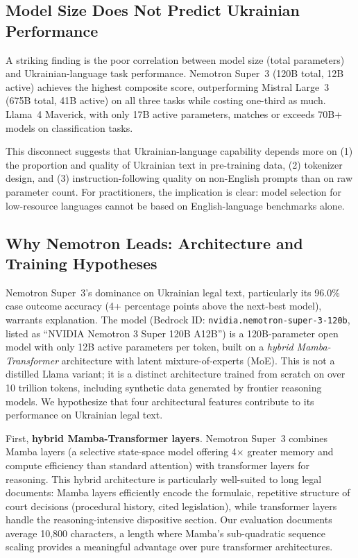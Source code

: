 \documentclass[11pt,a4paper]{article}
\begin{document}
\subsection{Model Size Does Not Predict Ukrainian Performance}

A striking finding is the poor correlation between model size (total parameters) and Ukrainian-language task performance. Nemotron Super~3 (120B total, 12B active) achieves the highest composite score, outperforming Mistral Large~3 (675B total, 41B active) on all three tasks while costing one-third as much. Llama~4 Maverick, with only 17B active parameters, matches or exceeds 70B+ models on classification tasks.

This disconnect suggests that Ukrainian-language capability depends more on (1) the proportion and quality of Ukrainian text in pre-training data, (2) tokenizer design, and (3) instruction-following quality on non-English prompts than on raw parameter count. For practitioners, the implication is clear: model selection for low-resource languages cannot be based on English-language benchmarks alone.

\subsection{Why Nemotron Leads: Architecture and Training Hypotheses}

Nemotron Super~3's dominance on Ukrainian legal text, particularly its 96.0\% case outcome accuracy (4+ percentage points above the next-best model), warrants explanation. The model (Bedrock ID: \texttt{nvidia.nemotron-super-3-120b}, listed as ``NVIDIA Nemotron 3 Super 120B A12B'') is a 120B-parameter open model with only 12B active parameters per token, built on a \emph{hybrid Mamba-Transformer} architecture with latent mixture-of-experts (MoE). This is not a distilled Llama variant; it is a distinct architecture trained from scratch on over 10 trillion tokens, including synthetic data generated by frontier reasoning models. We hypothesize that four architectural features contribute to its performance on Ukrainian legal text.

First, \textbf{hybrid Mamba-Transformer layers}. Nemotron Super~3 combines Mamba layers (a selective state-space model offering 4$\times$ greater memory and compute efficiency than standard attention) with transformer layers for reasoning. This hybrid architecture is particularly well-suited to long legal documents: Mamba layers efficiently encode the formulaic, repetitive structure of court decisions (procedural history, cited legislation), while transformer layers handle the reasoning-intensive dispositive section. Our evaluation documents average 10,800 characters, a length where Mamba's sub-quadratic sequence scaling provides a meaningful advantage over pure transformer architectures.
\end{document}
